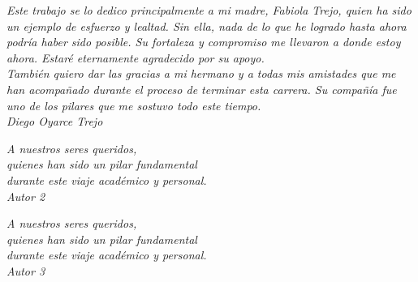\begin{flushright}
    \textit{Este trabajo se lo dedico principalmente a mi madre, Fabiola Trejo, quien ha sido un ejemplo de esfuerzo y lealtad. Sin ella, nada de lo que he logrado hasta ahora podría haber sido posible. Su fortaleza y compromiso me llevaron a donde estoy ahora. Estaré eternamente agradecido por su apoyo. \\
    También quiero dar las gracias a mi hermano y a todas mis amistades que me han acompañado durante el proceso de terminar esta carrera. Su compañía fue uno de los pilares que me sostuvo todo este tiempo. \\}
    \textit{Diego Oyarce Trejo}
\end{flushright}

\vspace{2cm}

\begin{flushright}
    \textit{A nuestros seres queridos,\\
    quienes han sido un pilar fundamental \\
    durante este viaje académico y personal. \\}
    \textit{Autor 2}
\end{flushright}

\vspace{2cm}

\begin{flushright}
    \textit{A nuestros seres queridos,\\
    quienes han sido un pilar fundamental \\
    durante este viaje académico y personal. \\}
    \textit{Autor 3}
\end{flushright}